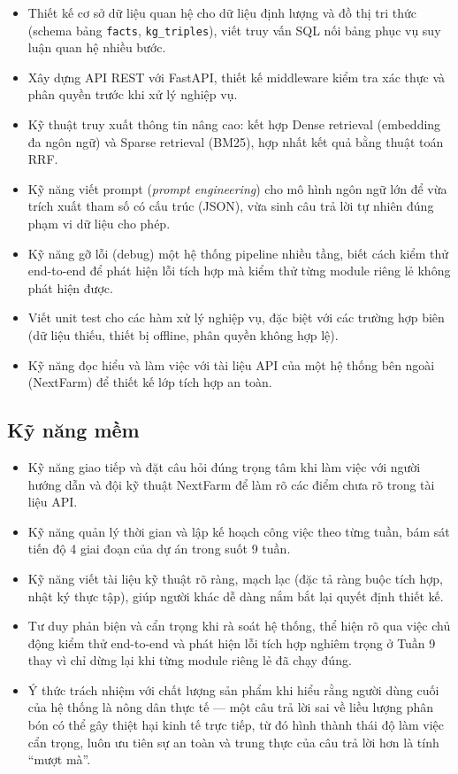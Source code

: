 \begin{itemize}
    \item Thiết kế cơ sở dữ liệu quan hệ cho dữ liệu định lượng và đồ thị tri thức
    (schema bảng \texttt{facts}, \texttt{kg\_triples}), viết truy vấn SQL nối bảng phục
    vụ suy luận quan hệ nhiều bước.
    \item Xây dựng API REST với FastAPI, thiết kế middleware kiểm tra xác thực và phân
    quyền trước khi xử lý nghiệp vụ.
    \item Kỹ thuật truy xuất thông tin nâng cao: kết hợp Dense retrieval (embedding
    đa ngôn ngữ) và Sparse retrieval (BM25), hợp nhất kết quả bằng thuật toán RRF.
    \item Kỹ năng viết prompt (\textit{prompt engineering}) cho mô hình ngôn ngữ lớn để
    vừa trích xuất tham số có cấu trúc (JSON), vừa sinh câu trả lời tự nhiên đúng phạm
    vi dữ liệu cho phép.
    \item Kỹ năng gỡ lỗi (debug) một hệ thống pipeline nhiều tầng, biết cách kiểm thử
    end-to-end để phát hiện lỗi tích hợp mà kiểm thử từng module riêng lẻ không phát
    hiện được.
    \item Viết unit test cho các hàm xử lý nghiệp vụ, đặc biệt với các trường hợp biên
    (dữ liệu thiếu, thiết bị offline, phân quyền không hợp lệ).
    \item Kỹ năng đọc hiểu và làm việc với tài liệu API của một hệ thống bên ngoài
    (NextFarm) để thiết kế lớp tích hợp an toàn.
\end{itemize}

\subsection{Kỹ năng mềm}

\begin{itemize}
    \item Kỹ năng giao tiếp và đặt câu hỏi đúng trọng tâm khi làm việc với người hướng
    dẫn và đội kỹ thuật NextFarm để làm rõ các điểm chưa rõ trong tài liệu API.
    \item Kỹ năng quản lý thời gian và lập kế hoạch công việc theo từng tuần, bám sát
    tiến độ 4 giai đoạn của dự án trong suốt 9 tuần.
    \item Kỹ năng viết tài liệu kỹ thuật rõ ràng, mạch lạc (đặc tả ràng buộc tích hợp,
    nhật ký thực tập), giúp người khác dễ dàng nắm bắt lại quyết định thiết kế.
    \item Tư duy phản biện và cẩn trọng khi rà soát hệ thống, thể hiện rõ qua việc chủ
    động kiểm thử end-to-end và phát hiện lỗi tích hợp nghiêm trọng ở Tuần 9 thay vì chỉ
    dừng lại khi từng module riêng lẻ đã chạy đúng.
    \item Ý thức trách nhiệm với chất lượng sản phẩm khi hiểu rằng người dùng cuối của
    hệ thống là nông dân thực tế — một câu trả lời sai về liều lượng phân bón có thể gây
    thiệt hại kinh tế trực tiếp, từ đó hình thành thái độ làm việc cẩn trọng, luôn ưu
    tiên sự an toàn và trung thực của câu trả lời hơn là tính ``mượt mà''.
\end{itemize}

